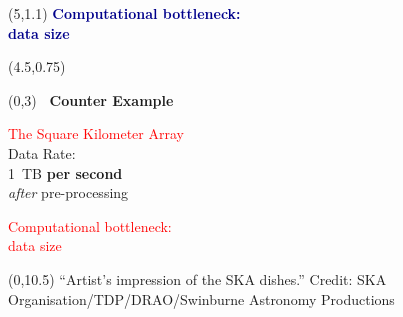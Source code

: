 \documentclass{article}
\renewcommand{\small}       {\fontsize{12}{14}\selectfont}
\renewcommand{\Large}       {\fontsize{20.74}{25}\selectfont}
\renewcommand{\Huge}        {\fontsize{35.83}{45}\selectfont}
\newcommand{\VERYHuge}      {\fontsize{61.92}{77}\selectfont}
\begin{document}
\begin{textblock}{5}(5,1.1)\Large
\centering \textcolor{DarkBlue}{\textbf{Computational bottleneck:\\ data size\vspace{0.5in}}}  \vspace{0.1in}
\end{textblock}


\begin{textblock}{1}(4.5,0.75)
\centering {\VERYHuge vs.\vspace{1in}}\vspace{0.1in}
\end{textblock}

\begin{textblock}{5}(0,3)\Large\centering
\bf\ 
{\Huge Counter Example}\vspace{0.1in}

\textcolor{Red}{The Square Kilometer Array}\\
Data Rate:\\ 1~TB \textbf{per second}\\
\textit{after} pre-processing\vspace{0.2in}


\textcolor{Red}{Computational bottleneck:\\ data size}
\end{textblock}

\begin{textblock}{10}(0,10.5)
{\small ``Artist's impression of the SKA dishes.'' Credit: SKA Organisation/TDP/DRAO/Swinburne Astronomy Productions}
\end{textblock}

\
\clearpage
\end{document}
